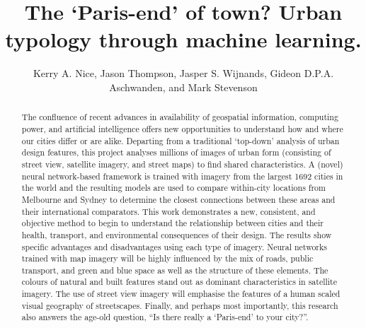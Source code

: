 \documentclass[Crown,sageh,times]{sagej}
\begin{document}
\title{The `Paris-end' of town? Urban typology through machine learning.}

\author{Kerry A. Nice, Jason Thompson, Jasper S. Wijnands, Gideon D.P.A. Aschwanden, and Mark Stevenson}






\begin{abstract}

The confluence of recent advances in availability of geospatial information, computing power, and artificial intelligence offers new opportunities to understand how and where our cities differ or are alike. Departing from a traditional `top-down' analysis of urban design features, this project analyses millions of images of urban form (consisting of street view, satellite imagery, and street maps) to find shared characteristics. A (novel) neural network-based framework is trained with imagery from the largest 1692 cities in the world and the resulting models are used to compare within-city locations from Melbourne and Sydney to determine the closest connections between these areas and their international comparators. This work demonstrates a new, consistent, and objective method to begin to understand the relationship between cities and their health, transport, and environmental consequences of their design. The results show specific advantages and disadvantages using each type of imagery. Neural networks trained with map imagery will be highly influenced by the mix of roads, public transport, and green and blue space as well as the structure of these elements. The colours of natural and built features stand out as dominant characteristics in satellite imagery. The use of street view imagery will emphasise the features of a human scaled visual geography of streetscapes. Finally, and perhaps most importantly, this research also answers the age-old question, ``Is there really a `Paris-end' to your city?''.
\end{abstract}

\end{document}
